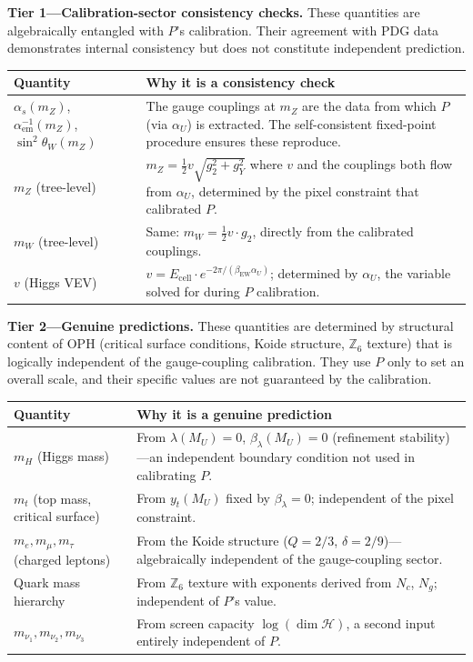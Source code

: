 \textbf{Tier 1---Calibration-sector consistency checks.} These quantities are algebraically entangled with \(P\)'s calibration. Their agreement with PDG data demonstrates internal consistency but does not constitute independent prediction.

{\footnotesize
\begin{longtable}[]{@{}>{\RaggedRight\arraybackslash}p{}>{\RaggedRight\arraybackslash}p{}@{}}
\toprule
Quantity & Why it is a consistency check \\
\midrule
\endhead
\bottomrule
\endfoot
\(\alpha_s(m_Z)\), \(\alpha_{\text{em}}^{-1}(m_Z)\), \(\sin^2\theta_W(m_Z)\) & The gauge couplings at \(m_Z\) are the data from which \(P\) (via \(\alpha_U\)) is extracted. The self-consistent fixed-point procedure ensures these reproduce. \\
\(m_Z\) (tree-level) & \(m_Z = \frac{1}{2}v\sqrt{g_2^2 + g_Y^2}\) where \(v\) and the couplings both flow from \(\alpha_U\), determined by the pixel constraint that calibrated \(P\). \\
\(m_W\) (tree-level) & Same: \(m_W = \frac{1}{2}v \cdot g_2\), directly from the calibrated couplings. \\
\(v\) (Higgs VEV) & \(v = E_{\text{cell}} \cdot e^{-2\pi/(\beta_{\text{EW}} \alpha_U)}\); determined by \(\alpha_U\), the variable solved for during \(P\) calibration. \\
\end{longtable}
}

\textbf{Tier 2---Genuine predictions.} These quantities are determined by structural content of OPH (critical surface conditions, Koide structure, \(\mathbb{Z}_6\) texture) that is logically independent of the gauge-coupling calibration. They use \(P\) only to set an overall scale, and their specific values are not guaranteed by the calibration.

{\footnotesize
\begin{longtable}[]{@{}>{\RaggedRight\arraybackslash}p{}>{\RaggedRight\arraybackslash}p{}@{}}
\toprule
Quantity & Why it is a genuine prediction \\
\midrule
\endhead
\bottomrule
\endfoot
\(m_H\) (Higgs mass) & From \(\lambda(M_U) = 0\), \(\beta_\lambda(M_U) = 0\) (refinement stability)---an independent boundary condition not used in calibrating \(P\). \\
\(m_t\) (top mass, critical surface) & From \(y_t(M_U)\) fixed by \(\beta_\lambda = 0\); independent of the pixel constraint. \\
\(m_e, m_\mu, m_\tau\) (charged leptons) & From the Koide structure (\(Q = 2/3\), \(\delta = 2/9\))---algebraically independent of the gauge-coupling sector. \\
Quark mass hierarchy & From \(\mathbb{Z}_6\) texture with exponents derived from \(N_c\), \(N_g\); independent of \(P\)'s value. \\
\(m_{\nu_1}, m_{\nu_2}, m_{\nu_3}\) & From screen capacity \(\log(\dim\mathcal{H})\), a second input entirely independent of \(P\). \\
\end{longtable}
}

